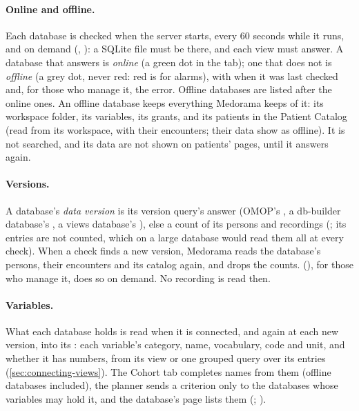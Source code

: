 \paragraph{Online and offline.} Each database is checked when the server starts, every 60
seconds while it runs, and on demand (, ): a SQLite
file must be there, and each view must answer. A database that answers is \emph{online} (a green
dot in the  tab); one that does not is \emph{offline} (a grey dot, never red: red
is for alarms), with when it was last checked and, for those who manage it, the error. Offline
databases are listed after the online ones. An offline database keeps everything Medorama keeps
of it: its workspace folder, its variables, its grants, and its patients in the Patient Catalog
(read from its workspace, with their encounters; their data show as offline). It is not searched, and its data are not shown on patients' pages,
until it answers again.

\paragraph{Versions.} A database's \emph{data version} is its version query's answer (OMOP's
, a db-builder database's , a views database's
), else a count of its persons and recordings
(; its entries are not counted, which on a large database
would read them all at every check). When a check finds a new version, Medorama reads the
database's persons, their encounters and its catalog again, and drops the counts. 
(), for those who manage it, does so on demand. No
recording is read then.

\paragraph{Variables.} What each database holds is read when it is connected, and again at each
new version, into its : each variable's category, name, vocabulary, code
and unit, and whether it has numbers, from its  view or one grouped query over
its entries (\cref{sec:connecting-views}). The Cohort tab completes names from them (offline
databases included), the planner sends a criterion only to the databases whose variables may hold
it, and the database's page lists them (; ).

